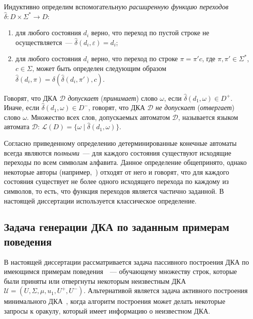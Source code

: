 Индуктивно определим вспомогательную \emph{расширенную функцию переходов} $\hat{\delta}: D \times \Sigma^{*} \rightarrow D$:
\begin{enumerate}
  \item для любого состояния $d_{i}$ верно, что переход по пустой строке не осуществляется~{---} $\hat{\delta}\left(d_{i},\varepsilon\right) = d_{i}$;
  \item для любого состояния $d_{i}$ верно, что переход по строке $\pi = \pi'c$, где $\pi,\pi' \in \Sigma^{*}$, $c \in \Sigma$, может быть определен следующим образом $\hat{\delta}\left(d_{i}, \pi\right) = \delta\left(\hat{\delta}\left(d_{i}, \pi'\right), c\right)$.
\end{enumerate}
Говорят, что ДКА $\mathcal{D}$ \emph{допускает} (\emph{принимает}) слово $\omega$, если $\hat{\delta}\left(d_{1}, \omega\right) \in D^{+}$. 
Иначе, если $\hat{\delta}\left(d_{1}, \omega\right) \in D^{-}$, говорят, что ДКА $\mathcal{D}$ \emph{не допускает} (\emph{отвергает}) слово $\omega$. 
Множество всех слов, допускаемых автоматом $\mathcal{D}$, называется языком автомата $\mathcal{D}$: $\mathcal{L}\left(D\right) = \{\omega \mid \hat{\delta}\left(d_{1}, \omega \right)\}$.

Согласно приведенному определению детерминированные конечные автоматы всегда являются \emph{полными}~--- для каждого состояния существуют исходящие переходы по всем символам алфавита. 
Данное определение общепринято, однако некоторые авторы (например,~\cite{mogensen-analysis-11}) отходят от него и говорят, что для каждого состояния существует не более одного исходящего перехода по каждому из символов, то есть, что функция переходов является частично заданной.
В настоящей диссертации используется классическое определение.

\subsection{Задача генерации ДКА по заданным примерам поведения}
\label{sec:review:dfa-inf:task}

В настоящей диссертации рассматривается задача пассивного построения ДКА по имеющимся примерам поведения~\cite{DBLP:journals/pr/BugalhoO05,DBLP:journals/pr/Higuera05}~--- обучающему множеству строк, которые были приняты или отвергнуты некоторым неизвестным ДКА $\mathcal{U} = \left(U,\Sigma,\mu,u_{1},U^{+},U^{-}\right)$. 
Альтернативой является задача активного построения минимального ДКА~\cite{Angluin-active-87,DBLP:conf/sfm/SteffenHM11,neider-phd-14}, когда алгоритм построения может делать некоторые запросы к оракулу, который имеет информацию о неизвестном ДКА.

